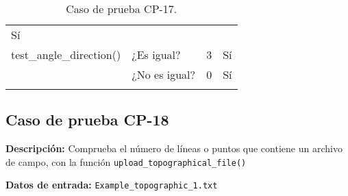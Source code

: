\begin{longtable}[]{@{}llll@{}}
\begin{minipage}[t]{0.05\columnwidth}
Sí\strut
\end{minipage}\tabularnewline
\begin{minipage}[t]{0.5\columnwidth}\raggedright\strut
\small{test\_angle\_direction()}\strut
\end{minipage} & \begin{minipage}[t]{0.20\columnwidth}\raggedright\strut
¿Es igual?\strut
\end{minipage} & \begin{minipage}[t]{0.15\columnwidth}\raggedright\strut
3\strut
\end{minipage} & \begin{minipage}[t]{0.05\columnwidth}\raggedright\strut
Sí\strut
\end{minipage}\tabularnewline
\begin{minipage}[t]{0.5\columnwidth}\raggedright\strut
\strut
\end{minipage} & \begin{minipage}[t]{0.20\columnwidth}\raggedright\strut
¿No es igual?\strut
\end{minipage} & \begin{minipage}[t]{0.15\columnwidth}\raggedright\strut
0\strut
\end{minipage} & \begin{minipage}[t]{0.05\columnwidth}\raggedright\strut
Sí\strut
\end{minipage}\tabularnewline
\bottomrule
\caption{Caso de prueba CP-17.}
\end{longtable}

\subsection{Caso de prueba CP-18}

\textbf{Descripción:} Comprueba el número de líneas o puntos que contiene un archivo de campo, con la función \texttt{upload\_topographical\_file()}

\textbf{Datos de entrada:} \texttt{Example\_topographic\_1.txt}


